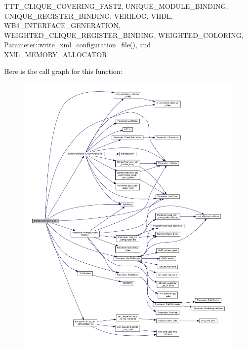 T\+T\+T\+\_\+\+C\+L\+I\+Q\+U\+E\+\_\+\+C\+O\+V\+E\+R\+I\+N\+G\+\_\+\+F\+A\+S\+T2, U\+N\+I\+Q\+U\+E\+\_\+\+M\+O\+D\+U\+L\+E\+\_\+\+B\+I\+N\+D\+I\+NG, U\+N\+I\+Q\+U\+E\+\_\+\+R\+E\+G\+I\+S\+T\+E\+R\+\_\+\+B\+I\+N\+D\+I\+NG, V\+E\+R\+I\+L\+OG, V\+H\+DL, W\+B4\+\_\+\+I\+N\+T\+E\+R\+F\+A\+C\+E\+\_\+\+G\+E\+N\+E\+R\+A\+T\+I\+ON, W\+E\+I\+G\+H\+T\+E\+D\+\_\+\+C\+L\+I\+Q\+U\+E\+\_\+\+R\+E\+G\+I\+S\+T\+E\+R\+\_\+\+B\+I\+N\+D\+I\+NG, W\+E\+I\+G\+H\+T\+E\+D\+\_\+\+C\+O\+L\+O\+R\+I\+NG, Parameter\+::write\+\_\+xml\+\_\+configuration\+\_\+file(), and X\+M\+L\+\_\+\+M\+E\+M\+O\+R\+Y\+\_\+\+A\+L\+L\+O\+C\+A\+T\+OR.

Here is the call graph for this function\+:
\nopagebreak
\begin{figure}[H]
\begin{center}
\leavevmode
\includegraphics[width=350pt]{d4/d67/classBambuParameter_ad89abd3e8793ce6f8324d3acc74b2faa_cgraph}
\end{center}
\end{figure}
\mbox{\label{classBambuParameter_a1bdb53362203ada5ee2dc62f66e4bae8}} 
